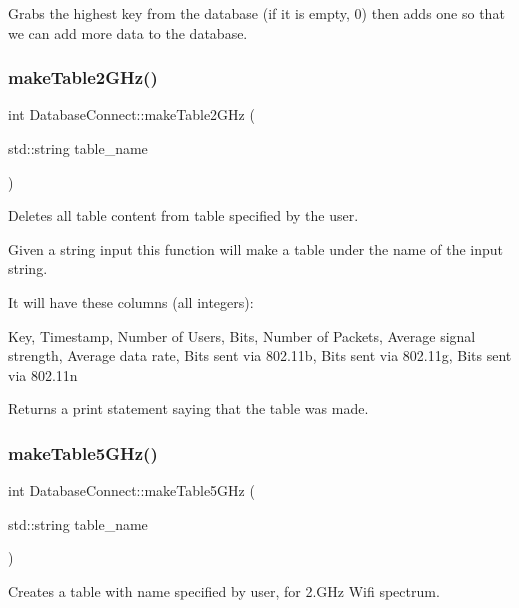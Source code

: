 Grabs the highest key from the database (if it is empty, 0) then adds one so that we can add more data to the database. \mbox{\label{classDatabaseConnect_aa0e8c669029e97ca8588c4bcddf7735e}} 
\subsubsection{\texorpdfstring{make\+Table2\+G\+Hz()}{makeTable2GHz()}}
{\footnotesize\ttfamily int Database\+Connect\+::make\+Table2\+G\+Hz (\begin{DoxyParamCaption}\item[{std\+::string}]{table\+\_\+name }\end{DoxyParamCaption})}



Deletes all table content from table specified by the user. 

Given a string input this function will make a table under the name of the input string.

It will have these columns (all integers)\+:

Key, Timestamp, Number of Users, Bits, Number of Packets, Average signal strength, Average data rate, Bits sent via 802.\+11b, Bits sent via 802.\+11g, Bits sent via 802.\+11n

Returns a print statement saying that the table was made. \mbox{\label{classDatabaseConnect_add4b088d6e5d4be6cbad6c1f0226be39}} 
\subsubsection{\texorpdfstring{make\+Table5\+G\+Hz()}{makeTable5GHz()}}
{\footnotesize\ttfamily int Database\+Connect\+::make\+Table5\+G\+Hz (\begin{DoxyParamCaption}\item[{std\+::string}]{table\+\_\+name }\end{DoxyParamCaption})}



Creates a table with name specified by user, for 2.\+G\+Hz Wifi spectrum. 

